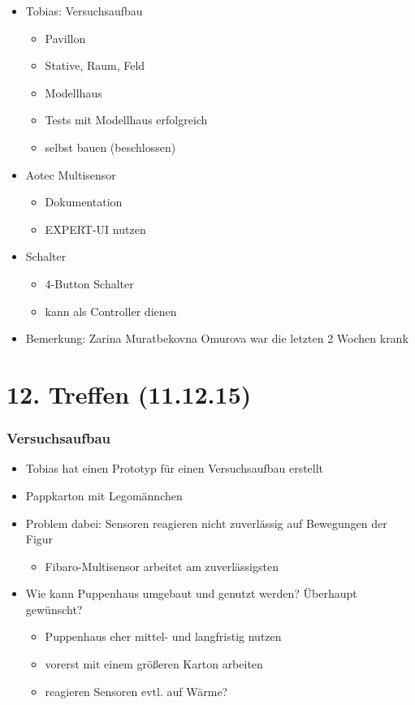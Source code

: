 \begin{itemize}
	\item Tobias: Versuchsaufbau
	\begin{itemize}
		\item Pavillon
		\item Stative, Raum, Feld
		\item Modellhaus
		\item Tests mit Modellhaus erfolgreich
		\item selbst bauen (beschlossen)
	\end{itemize}

	\item Aotec Multisensor
	\begin{itemize}
		\item Dokumentation
		\item EXPERT-UI nutzen
	\end{itemize}

	\item Schalter

	\begin{itemize}
		\item 4-Button Schalter
		\item kann als Controller dienen
	\end{itemize}

	\item Bemerkung: Zarina Muratbekovna Omurova war die letzten 2 Wochen krank
\end{itemize}

\section{12. Treffen (11.12.15)}
\subsubsection{Versuchsaufbau}

\begin{itemize}
	\item Tobias hat einen Prototyp für einen Versuchsaufbau erstellt
	\item Pappkarton mit Legomännchen
	\item Problem dabei: Sensoren reagieren nicht zuverlässig auf Bewegungen der Figur
	\begin{itemize}
		\item Fibaro-Multisensor arbeitet am zuverlässigsten
	\end{itemize}
	\item Wie kann Puppenhaus umgebaut und genutzt werden? Überhaupt gewünscht?
	\begin{itemize}
		\item Puppenhaus eher mittel- und langfristig nutzen
		\item vorerst mit einem größeren Karton arbeiten
		\item reagieren Sensoren evtl. auf Wärme?
	\end{itemize}
\end{itemize}

